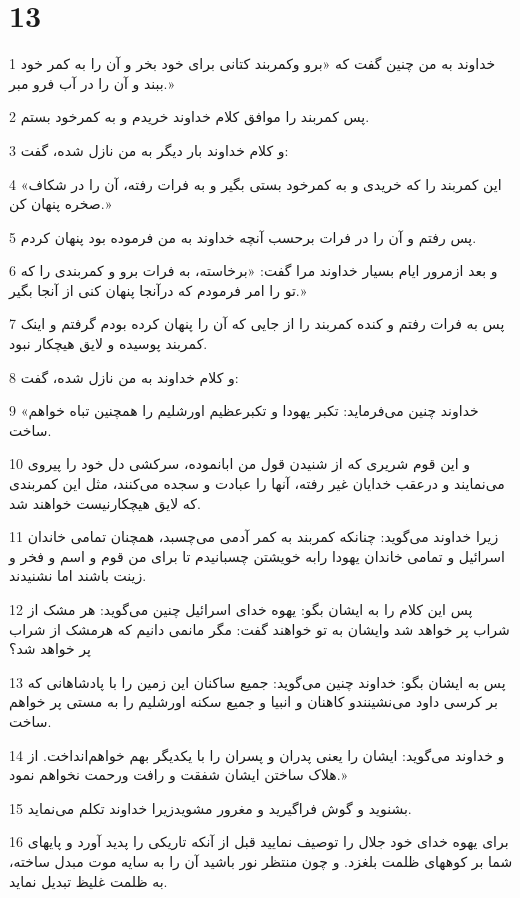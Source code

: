 \chapter{13}

\par 1 خداوند به من چنین گفت که «برو وکمربند کتانی برای خود بخر و آن را به کمر خود ببند و آن را در آب فرو مبر.»
\par 2 پس کمربند را موافق کلام خداوند خریدم و به کمرخود بستم.
\par 3 و کلام خداوند بار دیگر به من نازل شده، گفت:
\par 4 «این کمربند را که خریدی و به کمرخود بستی بگیر و به فرات رفته، آن را در شکاف صخره پنهان کن.»
\par 5 پس رفتم و آن را در فرات برحسب آنچه خداوند به من فرموده بود پنهان کردم.
\par 6 و بعد ازمرور ایام بسیار خداوند مرا گفت: «برخاسته، به فرات برو و کمربندی را که تو را امر فرمودم که درآنجا پنهان کنی از آنجا بگیر.»
\par 7 پس به فرات رفتم و کنده کمربند را از جایی که آن را پنهان کرده بودم گرفتم و اینک کمربند پوسیده و لایق هیچکار نبود.
\par 8 و کلام خداوند به من نازل شده، گفت:
\par 9 «خداوند چنین می‌فرماید: تکبر یهودا و تکبرعظیم اورشلیم را همچنین تباه خواهم ساخت.
\par 10 و این قوم شریری که از شنیدن قول من ابانموده، سرکشی دل خود را پیروی می‌نمایند و درعقب خدایان غیر رفته، آنها را عبادت و سجده می‌کنند، مثل این کمربندی که لایق هیچکارنیست خواهند شد.
\par 11 زیرا خداوند می‌گوید: چنانکه کمربند به کمر آدمی می‌چسبد، همچنان تمامی خاندان اسرائیل و تمامی خاندان یهودا رابه خویشتن چسبانیدم تا برای من قوم و اسم و فخر و زینت باشند اما نشنیدند.
\par 12 پس این کلام را به ایشان بگو: یهوه خدای اسرائیل چنین می‌گوید: هر مشک از شراب پر خواهد شد وایشان به تو خواهند گفت: مگر مانمی دانیم که هرمشک از شراب پر خواهد شد؟
\par 13 پس به ایشان بگو: خداوند چنین می‌گوید: جمیع ساکنان این زمین را با پادشاهانی که بر کرسی داود می‌نشینندو کاهنان و انبیا و جمیع سکنه اورشلیم را به مستی پر خواهم ساخت.
\par 14 و خداوند می‌گوید: ایشان را یعنی پدران و پسران را با یکدیگر بهم خواهم‌انداخت. از هلاک ساختن ایشان شفقت و رافت ورحمت نخواهم نمود.»
\par 15 بشنوید و گوش فرا‌گیرید و مغرور مشویدزیرا خداوند تکلم می‌نماید.
\par 16 برای یهوه خدای خود جلال را توصیف نمایید قبل از آنکه تاریکی را پدید آورد و پایهای شما بر کوههای ظلمت بلغزد. و چون منتظر نور باشید آن را به سایه موت مبدل ساخته، به ظلمت غلیظ تبدیل نماید.
